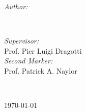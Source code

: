 \begin{titlepage}
    \begin{minipage}{0.4\textwidth}
        \begin{flushleft} \large
            \emph{Author:}\\
            \@author %
        \end{flushleft}
    \end{minipage}
    ~
    \begin{minipage}{0.4\textwidth}
        \begin{flushright} \large
            \emph{Supervisor:} \\
            Prof. Pier Luigi Dragotti \\[1.2em] %
            \emph{Second Marker:} \\
            Prof. Patrick A. Naylor %
        \end{flushright}
    \end{minipage}\\[2cm]
    \makeatother



    {\large \today}\\[2cm] %

    \vfill %

\end{titlepage}